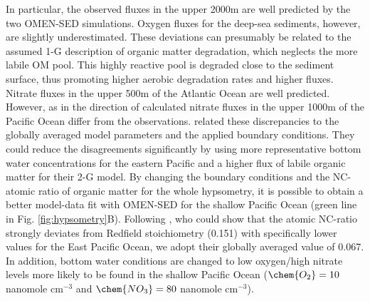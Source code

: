 \documentclass[gmd, manuscript]{copernicus}
\begin{document}
In particular, the observed  fluxes in the upper 2000m are well predicted by the two OMEN-SED simulations. Oxygen fluxes for the deep-sea sediments, however, are slightly underestimated. 
These deviations can presumably be related to the assumed 1-G description of organic matter degradation, which neglects the more labile OM pool. This highly reactive pool is degraded close to the sediment surface, 
thus promoting higher aerobic degradation rates and higher  fluxes.  
Nitrate fluxes in the upper 500m of the Atlantic Ocean are well predicted. However, as in \citet{middelburg_denitrification_1996} the direction of calculated nitrate fluxes in the upper 1000m of the Pacific Ocean differ from the observations. 
\citet{middelburg_denitrification_1996} related these discrepancies to the globally averaged model parameters and the applied boundary conditions. They could reduce the disagreements significantly by using more representative 
bottom water concentrations for the eastern Pacific and a higher flux of labile organic matter for their 2-G model. By changing the boundary conditions and the NC-atomic ratio of organic matter for the whole hypsometry, it is possible 
to obtain a better model-data fit with OMEN-SED for the shallow Pacific Ocean (green line in Fig. \ref{fig:hypsometry}B). 
Following \citet{bohlen_simple_2012}, who could show that the atomic NC-ratio strongly deviates from Redfield stoichiometry (0.151) with specifically lower values for the East Pacific Ocean, we adopt their globally averaged value of 0.067. 
In addition, bottom water conditions are changed to low oxygen/high nitrate levels more likely to be found in the shallow Pacific Ocean ($\chem{O_2} = 10$ nanomole cm$^{-3}$ and $\chem{NO_3} = 80$ nanomole cm$^{-3}$). 
\end{document}
